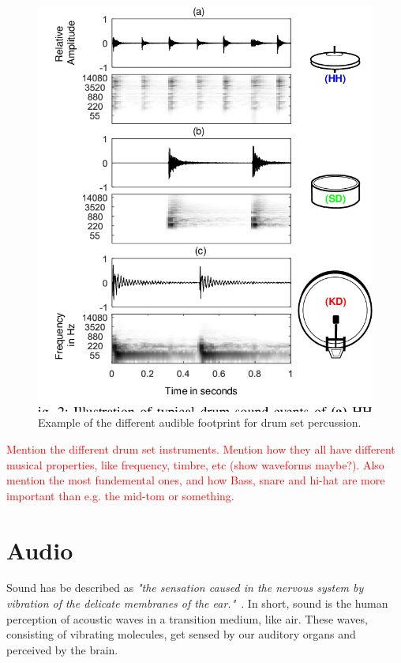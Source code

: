\begin{figure}[H]
    \centering
    \includegraphics[scale=0.5, trim={0 1cm 0 0},clip]{figures/drumsettimbre}
    \caption{Example of the different audible footprint for drum set percussion.}
    \label{DrumsetTimbreFigure}
\end{figure}

\textcolor{red}{Mention the different drum set instruments. Mention how they all have different musical properties, like frequency, timbre, etc (show waveforms maybe?). Also mention the most fundemental ones, and how Bass, snare and hi-hat are more important than e.g. the mid-tom or something.}

\section{Audio}

Sound has be described as \textit{"the sensation caused in the nervous system by vibration of the delicate membranes of the ear."}~\cite{1953fundamentals}. In short, sound is the human perception of acoustic waves in a transition medium, like air. These waves, consisting of vibrating molecules, get sensed by our auditory organs and perceived by the brain. 

